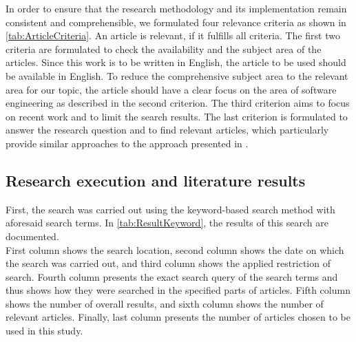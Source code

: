 In order to ensure that the research methodology and its implementation remain consistent and comprehensible, we formulated four relevance criteria as shown in \autoref{tab:ArticleCriteria}. An article is relevant, if it fulfills all criteria. The first two criteria are formulated to check the availability and the subject area of the articles. Since this work is to be written in English, the article to be used should be available in English. To reduce the comprehensive subject area to the relevant area for our topic, the article should have a clear focus on the area of software engineering as described in the second criterion. The third criterion aims to focus on recent work and to limit the search results. The last criterion is formulated to answer the research question and to find relevant articles, which particularly provide similar approaches to the approach presented in \cite{Paper1}.

\subsection*{Research execution and literature results}
\label{subsec:RE}

First, the search was carried out using the keyword-based search method with aforesaid search terms. In \autoref{tab:ResultKeyword}, the results of this search are documented.\\
First column shows the search location, second column shows the date on which the search was carried out, and third column shows the applied restriction of search. Fourth column presents the exact search query of the search terms and thus shows how they were searched in the specified parts of articles. Fifth column shows the number of overall results, and sixth column shows the number of relevant articles. Finally, last column presents the number of articles chosen to be used in this study.

